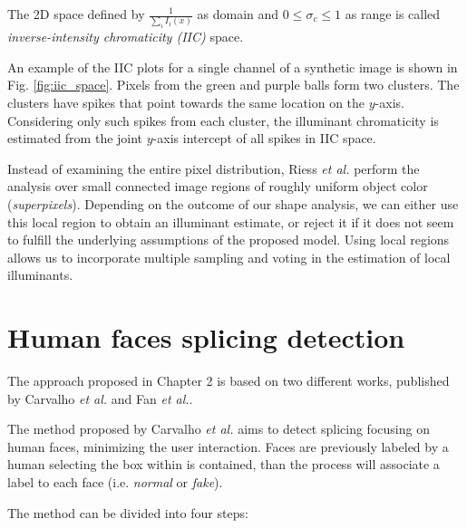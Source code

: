 The 2D space defined by $\frac{1}{\sum_{i} I_i(x)}$ as domain and $0 \leq \sigma_c \leq 1$ as range is called \emph{inverse-intensity chromaticity (IIC)} space.

An example of the IIC plots for a single channel of a synthetic image is shown in Fig. \ref{fig:iic_space}.
Pixels from the green and purple balls form two clusters. The clusters have spikes that point towards the same location on the $y$-axis. Considering only such spikes from each cluster, the illuminant chromaticity is estimated from the joint $y$-axis intercept of all spikes in IIC space.

Instead of examining the entire pixel distribution, Riess \emph{et al.}\cite{riess2010scene} perform the analysis over small connected image regions of roughly uniform object color (\emph{superpixels}). Depending on the outcome of our shape analysis, we can either use this local region to obtain an illuminant estimate, or reject it if it does not seem to fulfill the underlying assumptions of the proposed model. Using local regions allows us to incorporate multiple sampling and voting in the estimation of local illuminants.

\section{Human faces splicing detection}

The approach proposed in Chapter 2 is based on two different works, published by Carvalho \emph{et al.}\cite{carvalho2016illuminant} and Fan \emph{et al.}\cite{fan2015image}.

The method proposed by Carvalho \emph{et al.}\cite{carvalho2016illuminant} aims to detect splicing focusing on human faces, minimizing the user interaction. Faces are previously labeled by a human selecting the box within is contained, than the process will associate a label to each face (i.e. \emph{normal} or \emph{fake}).

The method can be divided into four steps:


